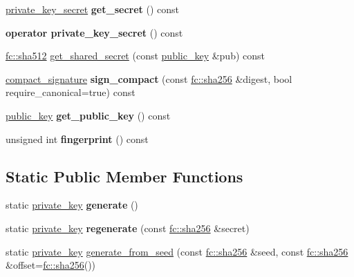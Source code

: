 \begin{DoxyCompactItemize}
\item 
\mbox{\label{classfc_1_1ecc_1_1private__key_a24fb0ebbb99a8404323387fd06d5145f}} 
\mbox{\hyperlink{classfc_1_1sha256}{private\+\_\+key\+\_\+secret}} {\bfseries get\+\_\+secret} () const
\item 
\mbox{\label{classfc_1_1ecc_1_1private__key_a2cc3896accde0c4a48663fec0d075979}} 
{\bfseries operator private\+\_\+key\+\_\+secret} () const
\item 
\mbox{\hyperlink{classfc_1_1sha512}{fc\+::sha512}} \mbox{\hyperlink{classfc_1_1ecc_1_1private__key_a81a1b0f5dacfd6f611d8291a0df60be7}{get\+\_\+shared\+\_\+secret}} (const \mbox{\hyperlink{classfc_1_1ecc_1_1public__key}{public\+\_\+key}} \&pub) const
\item 
\mbox{\label{classfc_1_1ecc_1_1private__key_a9641e922356152e449044813b029ea86}} 
\mbox{\hyperlink{classfc_1_1array}{compact\+\_\+signature}} {\bfseries sign\+\_\+compact} (const \mbox{\hyperlink{classfc_1_1sha256}{fc\+::sha256}} \&digest, bool require\+\_\+canonical=true) const
\item 
\mbox{\label{classfc_1_1ecc_1_1private__key_a11ee154d3fd6f6e4c882fe965dee3d89}} 
\mbox{\hyperlink{classfc_1_1ecc_1_1public__key}{public\+\_\+key}} {\bfseries get\+\_\+public\+\_\+key} () const
\item 
\mbox{\label{classfc_1_1ecc_1_1private__key_aa4d077eff99bc1fa9608cddab3a5fc58}} 
unsigned int {\bfseries fingerprint} () const
\end{DoxyCompactItemize}
\subsection*{Static Public Member Functions}
\begin{DoxyCompactItemize}
\item 
\mbox{\label{classfc_1_1ecc_1_1private__key_a047e701b70d0fcdcd3cd54a73c0af5a4}} 
static \mbox{\hyperlink{classfc_1_1ecc_1_1private__key}{private\+\_\+key}} {\bfseries generate} ()
\item 
\mbox{\label{classfc_1_1ecc_1_1private__key_abcc5312450e72cd78f78b7d2feb6c899}} 
static \mbox{\hyperlink{classfc_1_1ecc_1_1private__key}{private\+\_\+key}} {\bfseries regenerate} (const \mbox{\hyperlink{classfc_1_1sha256}{fc\+::sha256}} \&secret)
\item 
static \mbox{\hyperlink{classfc_1_1ecc_1_1private__key}{private\+\_\+key}} \mbox{\hyperlink{classfc_1_1ecc_1_1private__key_a748751090ea736a761cd3af9633eb7de}{generate\+\_\+from\+\_\+seed}} (const \mbox{\hyperlink{classfc_1_1sha256}{fc\+::sha256}} \&seed, const \mbox{\hyperlink{classfc_1_1sha256}{fc\+::sha256}} \&offset=\mbox{\hyperlink{classfc_1_1sha256}{fc\+::sha256}}())
\end{DoxyCompactItemize}
